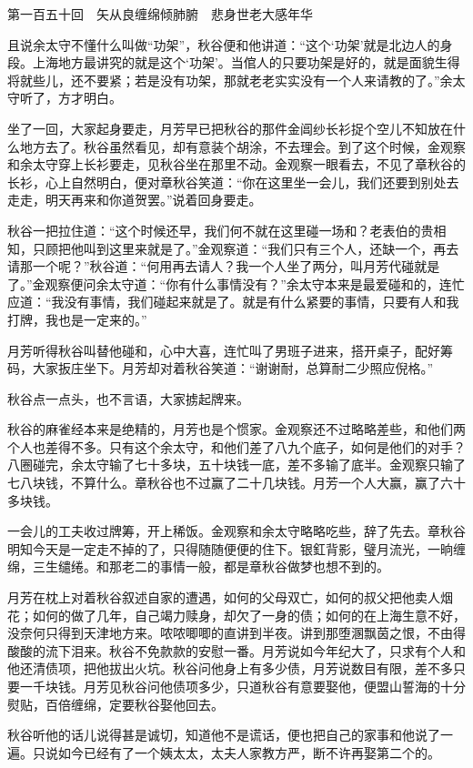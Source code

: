 \documentclass[12pt,UTF8]{ctexbook}
\begin{document}
{{{第一百五十回　矢从良缠绵倾肺腑　悲身世老大感年华





且说余太守不懂什么叫做“功架”，秋谷便和他讲道：“这个‘功架’就是北边人的身段。上海地方最讲究的就是这个‘功架’。当倌人的只要功架是好的，就是面貌生得将就些儿，还不要紧；若是没有功架，那就老老实实没有一个人来请教的了。”余太守听了，方才明白。

坐了一回，大家起身要走，月芳早已把秋谷的那件金阊纱长衫捉个空儿不知放在什么地方去了。秋谷虽然看见，却有意装个胡涂，不去理会。到了这个时候，金观察和余太守穿上长衫要走，见秋谷坐在那里不动。金观察一眼看去，不见了章秋谷的长衫，心上自然明白，便对章秋谷笑道：“你在这里坐一会儿，我们还要到别处去走走，明天再来和你道贺罢。”说着回身要走。

秋谷一把拉住道：“这个时候还早，我们何不就在这里碰一场和？老表伯的贵相知，只顾把他叫到这里来就是了。”金观察道：“我们只有三个人，还缺一个，再去请那一个呢？”秋谷道：“何用再去请人？我一个人坐了两分，叫月芳代碰就是了。”金观察便问余太守道：“你有什么事情没有？”余太守本来是最爱碰和的，连忙应道：“我没有事情，我们碰起来就是了。就是有什么紧要的事情，只要有人和我打牌，我也是一定来的。”

月芳听得秋谷叫替他碰和，心中大喜，连忙叫了男班子进来，搭开桌子，配好筹码，大家扳庄坐下。月芳却对着秋谷笑道：“谢谢耐，总算耐二少照应倪格。”

秋谷点一点头，也不言语，大家掳起牌来。

秋谷的麻雀经本来是绝精的，月芳也是个惯家。金观察还不过略略差些，和他们两个人也差得不多。只有这个余太守，和他们差了八九个底子，如何是他们的对手？八圈碰完，余太守输了七十多块，五十块钱一底，差不多输了底半。金观察只输了七八块钱，不算什么。章秋谷也不过赢了二十几块钱。月芳一个人大赢，赢了六十多块钱。

一会儿的工夫收过牌筹，开上稀饭。金观察和余太守略略吃些，辞了先去。章秋谷明知今天是一定走不掉的了，只得随随便便的住下。银釭背影，璧月流光，一晌缠绵，三生缱绻。和那老二的事情一般，都是章秋谷做梦也想不到的。

月芳在枕上对着秋谷叙述自家的遭遇，如何的父母双亡，如何的叔父把他卖人烟花；如何的做了几年，自己竭力赎身，却欠了一身的债；如何的在上海生意不好，没奈何只得到天津地方来。哝哝唧唧的直讲到半夜。讲到那堕溷飘茵之恨，不由得酸酸的流下泪来。秋谷不免款款的安慰一番。月芳说如今年纪大了，只求有个人和他还清债项，把他拔出火坑。秋谷问他身上有多少债，月芳说数目有限，差不多只要一千块钱。月芳见秋谷问他债项多少，只道秋谷有意要娶他，便盟山誓海的十分熨贴，百倍缠绵，定要秋谷娶他回去。

秋谷听他的话儿说得甚是诚切，知道他不是谎话，便也把自己的家事和他说了一遍。只说如今已经有了一个姨太太，太夫人家教方严，断不许再娶第二个的。

}}}
\end{document}
